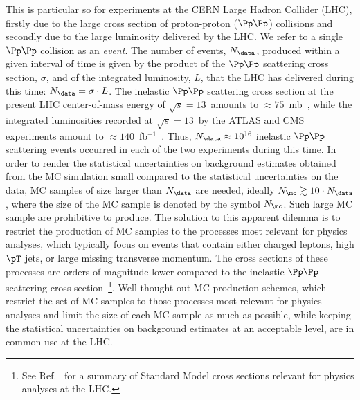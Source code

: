 This is particular so for experiments at the CERN Large Hadron Collider (LHC),
firstly due to the large cross section of proton-proton ($\Pp\Pp$) collisions and secondly due to the large luminosity delivered by the LHC.
We refer to a single $\Pp\Pp$ collision as an {\em event}.
The number of events, $N_{\data}$, produced within a given interval of time 
is given by the product of the $\Pp\Pp$ scattering cross section, $\sigma$, and of the integrated luminosity, $L$, that the LHC has delivered during this time:
$N_{\data} = \sigma \cdot L$.
The inelastic $\Pp\Pp$ scattering cross section at the present LHC center-of-mass energy of $\sqrt{s}=13$~\TeV amounts to $\approx 75$~mb~\cite{Aaboud:2016mmw,Sirunyan:2018nqx},
while the integrated luminosities recorded at $\sqrt{s}=13$~\TeV by the ATLAS and CMS experiments amount to $\approx 140$~fb$^{-1}$~\cite{ATLAS-CONF-2019-021,LUM-17-001,LUM-17-004,LUM-18-002}.
Thus, $N_{\data} \approx 10^{16}$ inelastic $\Pp\Pp$ scattering events occurred in each of the two experiments during this time.
In order to render the statistical uncertainties on background estimates obtained from the MC simulation small compared to the statistical uncertainties on the data,
MC samples of size larger than $N_{\data}$ are needed, ideally $N_{\mc} \gtrsim 10 \cdot N_{\data}$,
where the size of the MC sample is denoted by the symbol $N_{\mc}$.
Such large MC sample are prohibitive to produce.
The solution to this apparent dilemma is to restrict the production of MC samples to the processes most relevant for physics analyses,
which typically focus on events that contain either charged leptons, high $\pT$ jets, or large missing transverse momentum.
The cross sections of these processes are orders of magnitude lower compared to the inelastic $\Pp\Pp$ scattering cross section~\footnote{ 
See Ref.~\cite{StandardModelCrossSections} for a summary of Standard Model cross sections relevant for physics analyses at the LHC.}.
Well-thought-out MC production schemes,
which restrict the set of MC samples to those processes most relevant for physics analyses
and limit the size of each MC sample as much as possible, 
while keeping the statistical uncertainties on background estimates at an acceptable level,
are in common use at the LHC.

